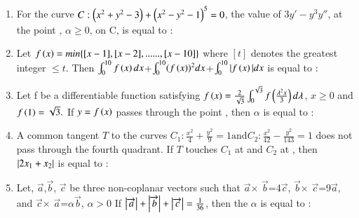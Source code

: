 \documentclass[journal]{IEEEtran}
\begin{document}
\begin{enumerate}
    \item For the curve $C: \left(x^2+y^2-3\right)+\left(x^2-y^2-1\right)^5=0$, the value of $3y'-y^3y''$, at the point \brak{\alpha,\alpha
    }, $\alpha \geq 0$, on C, is equal to  :\\
    \item Let $f\left(x\right)=min\{[x-1],[x-2],......,[x-10]\}$ where $[t]$ denotes the greatest integer $\leq t$. Then $\int_{0}^{10}f\left(x\right)dx$+$\int_{0}^{10}(f\left(x\right))^2dx$+$\int_{0}^{10}|f\left(x\right)|dx$ is equal to :\\

    \item Let f be a differentiable function satisfying $f\left(x\right)=\frac{2}{\sqrt{3}}\int_{0}^{\sqrt{3}}  f\left(\frac{\lambda^2x}{3}\right)d\lambda$, $x\geq0$ and $f\left(1\right)=\sqrt{3}.$ If $y=f\left(x\right)$ passes through the point , then $\alpha$ is equal to :\\
    \item A common tangent $T$ to the curves $C_1 : \frac{x^2}{4}+\frac{y^2}{9}=1 \text{and} C_2:\frac{x^2}{42}-\frac{y^2}{143}=1 $ does not pass through the fourth quadrant. If $T$ touches $C_1$ at  and $C_2$ at , then $\left\vert2x_1+x_2\right\vert$ is equal to :\\
    \item Let, $\overrightarrow{a}$,$\overrightarrow{b}$, $\overrightarrow{c}$ be three non-coplanar vectors such that  $\overrightarrow{a}$$\times$ $\overrightarrow{b}$=4$\overrightarrow{c}$,  $\overrightarrow{b}$$\times$ $\overrightarrow{c}$=9$\overrightarrow{a}$, and  $\overrightarrow{c}$$\times$ $\overrightarrow{a}$=$\alpha$$\overrightarrow{b}$, $\alpha >0$
If $\left\vert\overrightarrow{a}\right\vert+\left\vert\overrightarrow{b}\right\vert+\left\vert\overrightarrow{c}\right\vert=\frac{1}{36}$, then the $\alpha$ is equal to :

 \end{enumerate}
\end{document}
